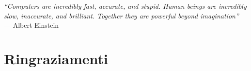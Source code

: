 
\cleardoublepage
{}
{}

\begin{flushright}{
	\slshape    
	``Computers are incredibly fast, accurate, and stupid. Human beings are incredibly slow, inaccurate, and brilliant. Together they are powerful beyond imagination''} \\ 
	\medskip
    --- Albert Einstein
\end{flushright}






\bigskip

\begingroup
\let\clearpage\relax
\let\cleardoublepage\relax
\let\cleardoublepage\relax

\chapter*{Ringraziamenti}





\endgroup

